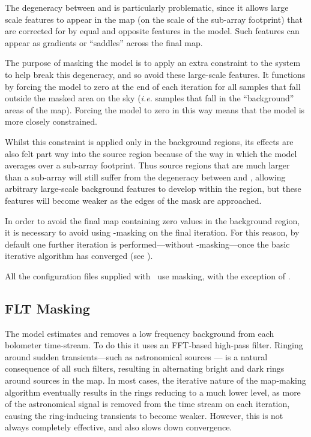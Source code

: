 The degeneracy between  and  is particularly
problematic, since it allows large scale features to appear in the map
(on the scale of the sub-array footprint) that are corrected for by equal
and opposite features in the  model. Such features can appear
as gradients or ``saddles'' across the final map.

The purpose of masking the  model is to apply an extra
constraint to the system to help break this degeneracy, and so avoid
these large-scale features. It functions by forcing the  model
to zero at the end of each iteration for all samples that fall outside the
masked area on the sky (\emph{i.e.} samples that fall in the ``background''
areas of the map). Forcing the  model to zero in this way means
that the  model is more closely constrained.

Whilst this constraint is applied only in the background regions, its
effects are also felt part way into the source region because of the way in
which the  model averages over a sub-array footprint. Thus source
regions that are much larger than a sub-array will still suffer from the
degeneracy between  and , allowing arbitrary
large-scale background features to develop within the region, but these
features will become weaker as the edges of the mask are approached.

In order to avoid the final  map containing zero values in the background
region, it is necessary to avoid using -masking on the final
iteration. For this reason, by default one further iteration is
performed---without -masking---once the basic iterative algorithm has
converged (see ).

All the configuration files supplied with \smurf\ use 
masking, with the exception of \blankfield.

\subsection{FLT Masking}
\label{sec:fltmask}

The  model estimates and removes a low frequency background
from each bolometer time-stream. To do this it uses an FFT-based high-pass
filter. Ringing around sudden transients---such as astronomical sources
--- is a natural consequence of all such filters, resulting in alternating
bright and dark rings around sources in the map. In most cases, the iterative
nature of the map-making algorithm eventually results in the rings
reducing to a much lower level, as more of the astronomical signal is removed
from the time stream on each iteration, causing the ring-inducing
transients to become weaker. However, this is not always completely
effective, and also slows down convergence.

